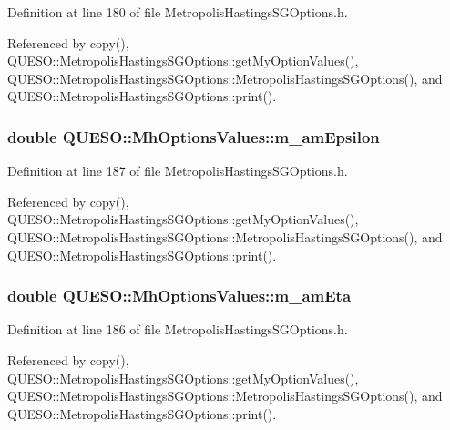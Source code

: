 Definition at line 180 of file Metropolis\-Hastings\-S\-G\-Options.\-h.



Referenced by copy(), Q\-U\-E\-S\-O\-::\-Metropolis\-Hastings\-S\-G\-Options\-::get\-My\-Option\-Values(), Q\-U\-E\-S\-O\-::\-Metropolis\-Hastings\-S\-G\-Options\-::\-Metropolis\-Hastings\-S\-G\-Options(), and Q\-U\-E\-S\-O\-::\-Metropolis\-Hastings\-S\-G\-Options\-::print().

\hypertarget{class_q_u_e_s_o_1_1_mh_options_values_af899c001e1bbdaf9c740d6b4dc0e13e0}{
\subsubsection[{m\-\_\-am\-Epsilon}]{\setlength{\rightskip}{0pt plus 5cm}double Q\-U\-E\-S\-O\-::\-Mh\-Options\-Values\-::m\-\_\-am\-Epsilon}}\label{class_q_u_e_s_o_1_1_mh_options_values_af899c001e1bbdaf9c740d6b4dc0e13e0}


Definition at line 187 of file Metropolis\-Hastings\-S\-G\-Options.\-h.



Referenced by copy(), Q\-U\-E\-S\-O\-::\-Metropolis\-Hastings\-S\-G\-Options\-::get\-My\-Option\-Values(), Q\-U\-E\-S\-O\-::\-Metropolis\-Hastings\-S\-G\-Options\-::\-Metropolis\-Hastings\-S\-G\-Options(), and Q\-U\-E\-S\-O\-::\-Metropolis\-Hastings\-S\-G\-Options\-::print().

\hypertarget{class_q_u_e_s_o_1_1_mh_options_values_ac901ea79ba9b77aae31e3ea07df140b1}{
\subsubsection[{m\-\_\-am\-Eta}]{\setlength{\rightskip}{0pt plus 5cm}double Q\-U\-E\-S\-O\-::\-Mh\-Options\-Values\-::m\-\_\-am\-Eta}}\label{class_q_u_e_s_o_1_1_mh_options_values_ac901ea79ba9b77aae31e3ea07df140b1}


Definition at line 186 of file Metropolis\-Hastings\-S\-G\-Options.\-h.



Referenced by copy(), Q\-U\-E\-S\-O\-::\-Metropolis\-Hastings\-S\-G\-Options\-::get\-My\-Option\-Values(), Q\-U\-E\-S\-O\-::\-Metropolis\-Hastings\-S\-G\-Options\-::\-Metropolis\-Hastings\-S\-G\-Options(), and Q\-U\-E\-S\-O\-::\-Metropolis\-Hastings\-S\-G\-Options\-::print().

